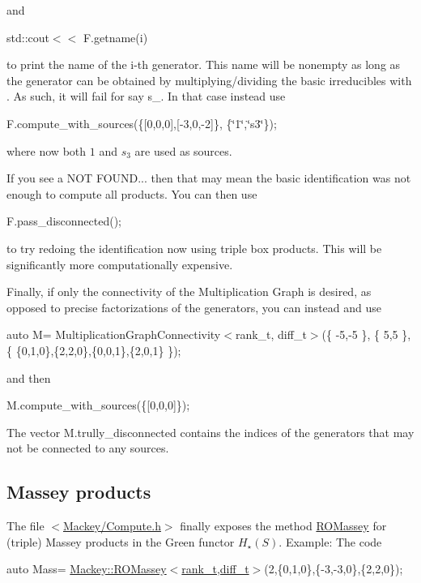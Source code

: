 and

{\ttfamily std\+::cout$<$$<$ F.\+getname(i) }

to print the name of the {\ttfamily i}-\/th generator. This name will be nonempty as long as the generator can be obtained by multiplying/dividing the basic irreducibles with {}. As such, it will fail for say {\ttfamily s\+\_}. In that case instead use

{\ttfamily F.\+compute\+\_\+with\+\_\+sources(\{\mbox{[}0,0,0\mbox{]},\mbox{[}-\/3,0,-\/2\mbox{]}\}, \{\char`\"{}1\char`\"{},\char`\"{}s3\char`\"{}\});}

where now both $1$ and $s_3$ are used as sources.

If you see a {\ttfamily N\+OT F\+O\+U\+ND...} then that may mean the basic identification was not enough to compute all products. You can then use

{\ttfamily F.\+pass\+\_\+disconnected();}

to try redoing the identification now using triple box products. This will be significantly more computationally expensive.

Finally, if only the connectivity of the Multiplication Graph is desired, as opposed to precise factorizations of the generators, you can instead and use

{\ttfamily auto M= Multiplication\+Graph\+Connectivity$<$rank\+\_\+t, diff\+\_\+t$>$(\{ -\/5,-\/5 \}, \{ 5,5 \}, \{ \{0,1,0\},\{2,2,0\},\{0,0,1\},\{2,0,1\} \});}

and then

{\ttfamily M.\+compute\+\_\+with\+\_\+sources(\{\mbox{[}0,0,0\mbox{]}\});}

The vector {\ttfamily M.\+trully\+\_\+disconnected} contains the indices of the generators that may not be connected to any sources. \hypertarget{use_step1Mass}{}\subsection{Massey products}\label{use_step1Mass}
The file {\ttfamily $<$\hyperlink{Compute_8h}{Mackey/\+Compute.\+h}$>$} finally exposes the method \hyperlink{namespaceMackey_ab75d7bcfa2d92d01bea0d5eef9f48398}{R\+O\+Massey} for (triple) Massey products in the Green functor $H_{\star}(S)$. Example\+: The code

{\ttfamily auto Mass= \hyperlink{namespaceMackey_ab75d7bcfa2d92d01bea0d5eef9f48398}{Mackey\+::\+R\+O\+Massey$<$rank\+\_\+t,diff\+\_\+t$>$}(2,\{0,1,0\},\{-\/3,-\/3,0\},\{2,2,0\});}

